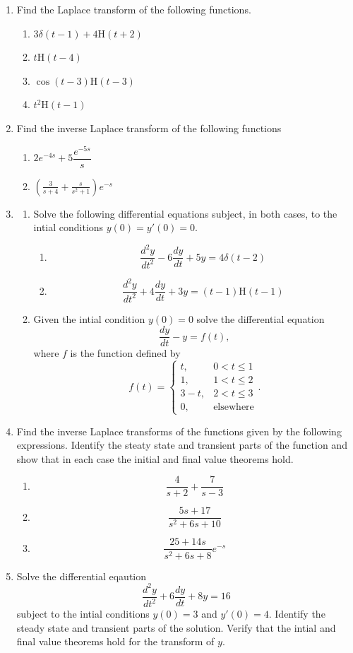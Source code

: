\documentclass[a4paper]{amsart}
\newcommand{\Hv}{\textrm{H}}
\begin{document}
\begin{enumerate}
    \item
Find the Laplace transform of the following functions.
\begin{enumerate}
\item
$3 \delta(t-1) + 4 \Hv(t+2)$
\item
$t \Hv(t-4)$
\item
$\cos{(t-3)} \Hv(t-3)$
\item
$t^2 \Hv(t-1)$
\end{enumerate}
\item
Find the inverse Laplace transform of the following functions
\begin{enumerate}
\item
$2 e^{-4s} + 5 \dfrac{e^{-5s}}{s}$
\item
$\left ( \frac{3}{s+4} + \frac{s}{s^2 +1} \right ) e^{-s}$
\end{enumerate}
\item
\begin{enumerate}
\item
Solve the following differential equations subject, in both cases, to the intial conditions $y(0)=y'(0)=0$.
\begin{enumerate}
\item
$$\frac{d^2y}{dt^2} - 6 \frac{dy}{dt} + 5y = 4 \delta(t-2)$$
\item
$$ \frac{d^2y}{dt^2} + 4 \frac{dy}{dt} + 3y = (t-1) \Hv(t-1)$$
\end{enumerate}
\item
Given the intial condition $y(0)=0$ solve the differential equation
$$ \frac{dy}{dt} - y = f(t),$$
where $f$ is the function defined by 
$$
   f(t) = \left\{
     \begin{array}{lr}
       t, &  0 < t \leq 1\\
       1, & 1 < t \leq 2 \\
       3-t, & 2 < t \leq 3 \\
       0, & \text{elsewhere} 
     \end{array}
   \right. .
$$
\end{enumerate}
\item
Find the inverse Laplace transforms of the functions given by the following expressions. Identify the steaty state and transient parts of the function and show that in each case the initial and final value theorems hold.
\begin{enumerate}
\item
$$\dfrac{4}{s+2} + \dfrac{7}{s-3} $$
\item
$$\dfrac{5s+17}{s^2 + 6s +10}$$
\item
$$\dfrac{25+14s}{s^2 + 6s + 8} e^{-s}$$
\end{enumerate}
\item
Solve the differential eqaution
$$\frac{d^2y}{dt^2} + 6 \frac{dy}{dt} + 8y = 16$$ 
subject to the intial conditions $y(0)=3$ and $y'(0)=4$. Identify the steady state and transient parts of the solution. Verify that the intial and final value theorems hold for the transform of $y$.
\end{enumerate}
\end{document}
